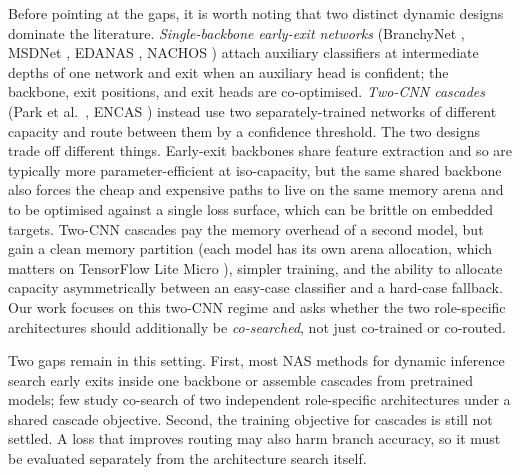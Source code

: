 \documentclass[conference]{IEEEtran}
\begin{document}
Before pointing at the gaps, it is worth noting that two distinct dynamic
designs dominate the literature. \emph{Single-backbone early-exit
networks} (BranchyNet \cite{teerapittayanon2017branchynet}, MSDNet
\cite{huang2018msdnet}, EDANAS \cite{gambella2023edanas}, NACHOS
\cite{gambella2025nachos}) attach auxiliary classifiers at intermediate
depths of one network and exit when an auxiliary head is confident; the
backbone, exit positions, and exit heads are co-optimised. \emph{Two-CNN
cascades} (Park et al.\ \cite{park2015biglittle}, ENCAS
\cite{chebykin2022encas}) instead use two separately-trained
networks of different capacity and route between them by a confidence
threshold. The two designs trade off different things. Early-exit
backbones share feature extraction and so are typically more
parameter-efficient at iso-capacity, but the same shared backbone also
forces the cheap and expensive paths to live on the same memory arena and
to be optimised against a single loss surface, which can be brittle on
embedded targets. Two-CNN cascades pay the memory overhead of a second
model, but gain a clean memory partition (each model has its own arena
allocation, which matters on TensorFlow Lite Micro
\cite{david2021tflm}), simpler training, and the ability to allocate
capacity asymmetrically between an easy-case classifier and a
hard-case fallback. Our work focuses on this two-CNN regime and asks
whether the two role-specific architectures should additionally be
\emph{co-searched}, not just co-trained or co-routed.

Two gaps remain in this setting. First, most NAS methods for dynamic
inference search early exits inside one backbone or assemble cascades
from pretrained models; few study co-search of two independent
role-specific architectures under a shared cascade objective. Second, the
training objective for cascades is still not settled. A loss that
improves routing may also harm branch accuracy, so it must be evaluated
separately from the architecture search itself.
\end{document}
